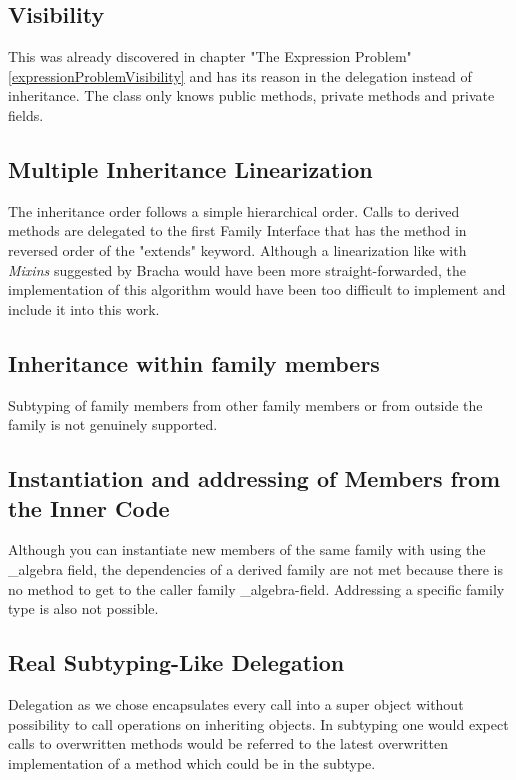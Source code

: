 \documentclass{report}
\begin{document}
\subsection{Visibility}

This was already discovered in chapter "The Expression Problem" \ref{expressionProblemVisibility} and has its reason in the delegation instead of inheritance.
The class only knows public methods, private methods and private fields.

\subsection{Multiple Inheritance Linearization}

The inheritance order follows a simple hierarchical order. Calls to derived methods are delegated to the first Family Interface that has the method in reversed order of the "extends" keyword. Although a linearization like with \emph{Mixins} suggested by Bracha \cite{Bracha-Mixin-1990} would have been more straight-forwarded, the implementation of this algorithm would have been too difficult to implement and include it into this work.

\subsection{Inheritance within family members}

Subtyping of family members from other family members or from outside the family is not genuinely supported.

\subsection{Instantiation and addressing of Members from the Inner Code}

Although you can instantiate new members of the same family with using the \_algebra field, the dependencies of a derived family are not met because there is no method to get to the caller family \_algebra-field.
Addressing a specific family type is also not possible.

\subsection{Real Subtyping-Like Delegation}

Delegation as we chose encapsulates every call into a super object without possibility to call operations on inheriting objects. In subtyping one would expect calls to overwritten methods would be referred to the latest overwritten implementation of a method which could be in the subtype.
\end{document}
